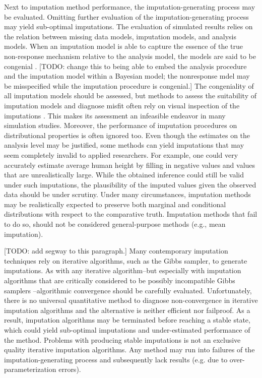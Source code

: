 \documentclass[bimj,fleqn]{w-art}
\begin{document}
Next to imputation method performance, the imputation-generating process may be evaluated. Omitting further evaluation of the imputation-generating process may yield sub-optimal imputations. The evaluation of simulated results relies on the relation between missing data models, imputation models, and analysis models. When an imputation model is able to capture the essence of the true non-response mechanism relative to the analysis model, the models are said to be congenial \citep{meng94}. [TODO: change this to being able to embed the analysis procedure and the imputation model within a Bayesian model; the nonresponse mdel may be misspecified while the imputation procedure is congenial.] The congeniality of all imputation models should be assessed, but methods to assess the suitability of imputation models and diagnose misfit often rely on visual inspection of the imputations \citep[see e.g.][]{abayomi2008diagnostics, bond16}. This makes its assessment an infeasible endeavor in many simulation studies. Moreover, the performance of imputation procedures on distributional properties is often ignored too. Even though the estimates on the analysis level may be justified, some methods can yield imputations that may seem completely invalid to applied researchers. For example, one could very accurately estimate average human height by filling in negative values and values that are unrealistically large. While the obtained inference could still be valid under such imputations, the plausibility of the imputed values given the observed data should be under scrutiny. Under many circumstances, imputation methods may be realistically expected to preserve both marginal and conditional distributions with respect to the comparative truth. Imputation methods that fail to do so, should not be considered general-purpose methods (e.g., mean imputation).

[TODO: add segway to this paragraph.] Many contemporary imputation techniques rely on iterative algorithms, such as the Gibbs sampler, to generate imputations. As with any iterative algorithm--but especially with imputation algorithms that are critically considered to be possibly incompatible Gibbs samplers \citep[PIGS,][]{li2012imputing}--algorithmic convergence should be carefully evaluated. Unfortunately, there is no universal quantitative method to diagnose non-convergence in iterative imputation algorithms \citep{zhu15, ober21} and the alternative \citep[visual inspection of the imputation algorithm;][]{buur18} is neither efficient nor failproof. As a result, imputation algorithms may be terminated before reaching a stable state, which could yield sub-optimal imputations and under-estimated performance of the method. Problems with producing stable imputations is not an exclusive quality iterative imputation algorithms. Any method may run into failures of the imputation-generating process and subsequently lack results (e.g. due to over-parameterization errors).
\end{document}
